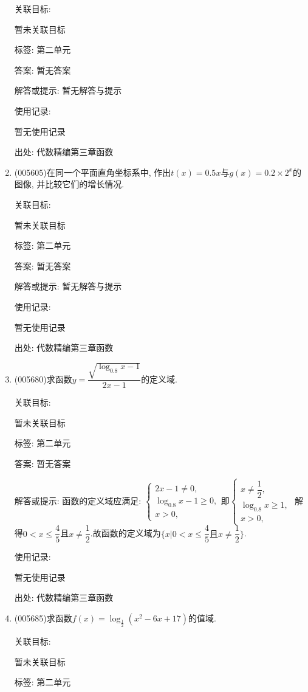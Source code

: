 \documentclass[10pt,a4paper]{article}
\begin{document}
\begin{enumerate}[1.]
关联目标:

暂未关联目标



标签: 第二单元

答案: 暂无答案

解答或提示: 暂无解答与提示

使用记录:

暂无使用记录


出处: 代数精编第三章函数
\item { (005605)}在同一个平面直角坐标系中, 作出$t(x)=0.5x$与$g(x)=0.2\times 2^x$的图像, 并比较它们的增长情况.


关联目标:

暂未关联目标



标签: 第二单元

答案: 暂无答案

解答或提示: 暂无解答与提示

使用记录:

暂无使用记录


出处: 代数精编第三章函数
\item { (005680)}求函数$y=\dfrac{\sqrt {\log_{0.8}x-1}}{2x-1}$的定义域.


关联目标:

暂未关联目标



标签: 第二单元

答案: 暂无答案

解答或提示: 函数的定义域应满足: $\begin{cases} 2x-1\ne 0, \\ \log_{0.8}x-1\ge 0, \\ x>0, \end{cases}$即$\begin{cases} x\ne \dfrac 12, \\ \log_{0.8}x\ge 1, \\ x>0, \end{cases}$
解得$0<x\le \dfrac 45$且$x\ne \dfrac 12$.故函数的定义域为$\{x|0<x\le \dfrac 45\text{且}x\ne \dfrac 12\}$.

使用记录:

暂无使用记录


出处: 代数精编第三章函数
\item { (005685)}求函数$f(x)=\log_{\frac 12}(x^2-6x+17)$的值域.


关联目标:

暂未关联目标



标签: 第二单元


\end{enumerate}
\end{document}
